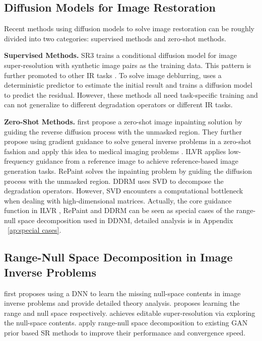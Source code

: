 \documentclass{article} \usepackage{iclr2023_conference,times}
\begin{document}
\subsection{Diffusion Models for Image Restoration}
Recent methods using diffusion models to solve image restoration can be roughly divided into two categories: supervised methods and zero-shot methods.

\textbf{Supervised Methods.} SR3 \citep{sr3} trains a conditional diffusion model for image super-resolution with synthetic image pairs as the training data. This pattern is further promoted to other IR tasks \citep{saharia2022palette}. To solve image deblurring, \cite{whang2022deblurring} uses a deterministic predictor to estimate the initial result and trains a diffusion model to predict the residual. However, these methods all need task-specific training and can not generalize to different degradation operators or different IR tasks.

\textbf{Zero-Shot Methods.} \cite{song2019generative} first propose a zero-shot image inpainting solution by guiding the reverse diffusion process with the unmasked region. They further propose using gradient guidance to solve general inverse problems in a zero-shot fashion and apply this idea to medical imaging problems \citep{song2020score,song2021solving}. ILVR \citep{choi2021ilvr} applies low-frequency guidance from a reference image to achieve reference-based image generation tasks. RePaint \citep{lugmayr2022repaint} solves the inpainting problem by guiding the diffusion process with the unmasked region. DDRM \citep{kawar2022denoising} uses SVD to decompose the degradation operators. However, SVD encounters a computational bottleneck when dealing with high-dimensional matrices. Actually, the core guidance function in ILVR \citep{choi2021ilvr}, RePaint \citep{lugmayr2022repaint} and DDRM \citep{kawar2022denoising} can be seen as special cases of the range-null space decomposition used in DDNM, detailed analysis is in Appendix ~\ref{ap:special cases}. 

\subsection{Range-Null Space Decomposition in Image Inverse Problems}
\cite{schwab2019deep} first proposes using a DNN to learn the missing null-space contents in image inverse problems and provide detailed theory analysis. \cite{chen2020deep} proposes learning the range and null space respectively. \cite{bahat2020explorable} achieves editable super-resolution via exploring the null-space contents. \cite{wang2022gan} apply range-null space decomposition to existing GAN prior based SR methods to improve their performance and convergence speed.
\end{document}
